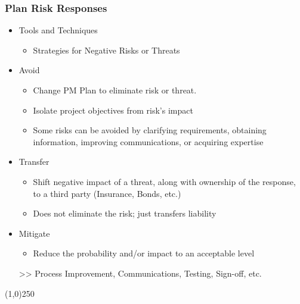 \begin{frame}
\frametitle{Plan Risk Responses}
\begin{itemize}
\item Tools and Techniques
\begin{itemize}
	\item Strategies for Negative Risks or Threats
\end{itemize}
\item Avoid
\begin{itemize}
	\item Change PM Plan to eliminate risk or threat.
\item Isolate project objectives from risk's impact
\item Some risks can be avoided by clarifying requirements, obtaining information, improving communications, or acquiring expertise
\end{itemize}
\item Transfer
\begin{itemize}
	\item Shift negative impact of a threat, along with ownership of the response, to a third party (Insurance, Bonds, etc.)
\item Does not eliminate the risk; just transfers liability
\end{itemize}
\item Mitigate
\begin{itemize}
	\item Reduce the probability and/or impact to an acceptable level
\end{itemize}
>> Process Improvement, Communications, Testing, Sign-off, etc.
\end{itemize}
\end{frame}\begin{center}\line(1,0){250}\end{center}




